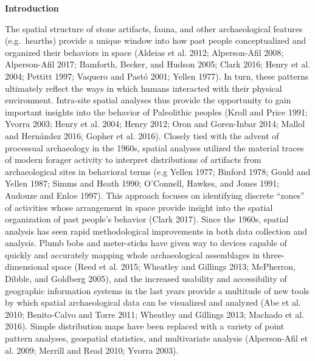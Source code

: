 \documentclass[smallextended]{svjour3}       %
\begin{document}
\def\spacingset#1{\renewcommand{\baselinestretch}%
{#1}\small\normalsize} \spacingset{1}


\pagebreak
\linenumbers
\doublespacing

\textbf{Introduction}

The spatial structure of stone artifacts, fauna, and other
archaeological features (e.g.~hearths) provide a unique window into how
past people conceptualized and organized their behaviors in space
(Aldeias et al. 2012; Alperson-Afil 2008; Alperson-Afil 2017; Bamforth,
Becker, and Hudson 2005; Clark 2016; Henry et al. 2004; Pettitt 1997;
Vaquero and Pastó 2001; Yellen 1977). In turn, these patterns ultimately
reflect the ways in which humans interacted with their physical
environment. Intra-site spatial analyses thus provide the opportunity to
gain important insights into the behavior of Paleolithic peoples (Kroll
and Price 1991; Yvorra 2003; Henry et al. 2004; Henry 2012; Oron and
Goren-Inbar 2014; Mallol and Hernández 2016; Gopher et al. 2016).
Closely tied with the advent of processual archaeology in the 1960s,
spatial analyses utilized the material traces of modern forager activity
to interpret distributions of artifacts from archaeological sites in
behavioral terms (e.g Yellen 1977; Binford 1978; Gould and Yellen 1987;
Simms and Heath 1990; O'Connell, Hawkes, and Jones 1991; Audouze and
Enloe 1997). This approach focuses on identifying discrete ``zones'' of
activities whose arrangement in space provide insight into the spatial
organization of past people's behavior (Clark 2017). Since the 1960s,
spatial analysis has seen rapid methodological improvements in both data
collection and analysis. Plumb bobs and meter-sticks have given way to
devices capable of quickly and accurately mapping whole archaeological
assemblages in three-dimensional space (Reed et al. 2015; Wheatley and
Gillings 2013; McPherron, Dibble, and Goldberg 2005), and the increased
usability and accessibility of geographic information systems in the
last years provide a multitude of new tools by which spatial
archaeological data can be visualized and analyzed (Abe et al. 2010;
Benito-Calvo and Torre 2011; Wheatley and Gillings 2013; Machado et al.
2016). Simple distribution maps have been replaced with a variety of
point pattern analyses, geospatial statistics, and multivariate analysis
(Alperson-Afil et al. 2009; Merrill and Read 2010; Yvorra 2003).
\end{document}
